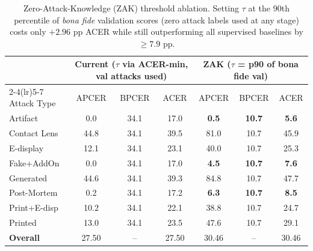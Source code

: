 \begin{table}[t]
\centering
\caption{Zero-Attack-Knowledge (ZAK) threshold ablation. Setting $\tau$ at the 90th percentile of \emph{bona fide} validation scores (zero attack labels used at any stage) costs only $+2.96$ pp ACER while still outperforming all supervised baselines by $\geq7.9$ pp.}
\label{tab:zak}
\setlength{\tabcolsep}{4pt}
\begin{tabular}{lcccccc}
\toprule
& \multicolumn{3}{c}{Current ($\tau$ via ACER-min, val attacks used)} & \multicolumn{3}{c}{ZAK ($\tau$ = p90 of bona fide val)} \\
\cmidrule(lr){2-4}\cmidrule(lr){5-7}
Attack Type & APCER & BPCER & ACER & APCER & BPCER & ACER \\ \midrule
Artifact & 0.0 & 34.1 & 17.0 & \textbf{0.5} & \textbf{10.7} & \textbf{5.6} \\
Contact Lens & 44.8 & 34.1 & 39.5 & 81.0 & 10.7 & 45.9 \\
E-display & 12.1 & 34.1 & 23.1 & 40.0 & 10.7 & 25.3 \\
Fake+AddOn & 0.0 & 34.1 & 17.0 & \textbf{4.5} & \textbf{10.7} & \textbf{7.6} \\
Generated & 44.6 & 34.1 & 39.3 & 84.8 & 10.7 & 47.7 \\
Post-Mortem & 0.2 & 34.1 & 17.2 & \textbf{6.3} & \textbf{10.7} & \textbf{8.5} \\
Print+E-disp & 10.2 & 34.1 & 22.1 & 38.8 & 10.7 & 24.7 \\
Printed & 13.0 & 34.1 & 23.5 & 47.6 & 10.7 & 29.1 \\
\midrule
\textbf{Overall} & 27.50 & -- & 27.50 & 30.46 & -- & 30.46 \\
\bottomrule
\end{tabular}
\end{table}